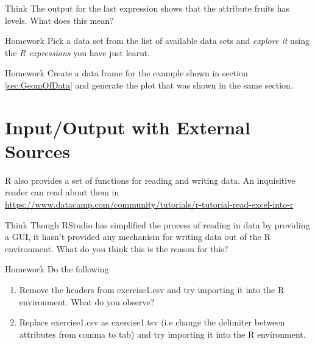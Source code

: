 \begin{DIY}{Think}
The output for the last expression shows that the attribute fruits has levels. What does this mean?
\end{DIY}

\begin{DIY}{Homework}
Pick a data set from the list of available data sets and \emph{explore it} using the \emph{R expressions} you have just learnt.
\end{DIY}

\begin{DIY}{Homework}
Create a data frame for the example shown in section \ref{sec:GeomOfData} and generate the plot that was shown in the same section.
\end{DIY}


\newpage
\section{Input/Output with External Sources}
\begin{HIGHLIGHT}
\par{}
R also provides a set of functions for reading and writing data. An inquisitive reader can read about them in \textcolor{cyan}{\url{https://www.datacamp.com/community/tutorials/r-tutorial-read-excel-into-r}}
\end{HIGHLIGHT}

\begin{DIY}{Think}
Though RStudio has simplified the process of reading in data by providing a GUI, it hasn't provided any mechanism for writing data out of the R environment. What do you think this is the reason for this?  
\end{DIY}

\begin{DIY}{Homework}
Do the following
\begin{enumerate}
  \item Remove the headers from exercise1.csv and try importing it into the R environment. What do you observe?
  \item Replace exercise1.csv as exercise1.tsv (i.e change the delimiter between attributes from comma to tab) and try importing it into the R environment.
\end{enumerate}
\end{DIY}
